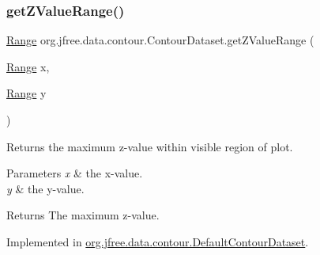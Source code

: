 \mbox{\label{interfaceorg_1_1jfree_1_1data_1_1contour_1_1_contour_dataset_a3a85edeb7c32dc8188b1d4fe945bb542}} 
\subsubsection{\texorpdfstring{get\+Z\+Value\+Range()}{getZValueRange()}}
{\footnotesize\ttfamily \mbox{\hyperlink{classorg_1_1jfree_1_1data_1_1_range}{Range}} org.\+jfree.\+data.\+contour.\+Contour\+Dataset.\+get\+Z\+Value\+Range (\begin{DoxyParamCaption}\item[{\mbox{\hyperlink{classorg_1_1jfree_1_1data_1_1_range}{Range}}}]{x,  }\item[{\mbox{\hyperlink{classorg_1_1jfree_1_1data_1_1_range}{Range}}}]{y }\end{DoxyParamCaption})}

Returns the maximum z-\/value within visible region of plot.


\begin{DoxyParams}{Parameters}
{\em x} & the x-\/value. \\
\hline
{\em y} & the y-\/value.\\
\hline
\end{DoxyParams}
\begin{DoxyReturn}{Returns}
The maximum z-\/value. 
\end{DoxyReturn}


Implemented in \mbox{\hyperlink{classorg_1_1jfree_1_1data_1_1contour_1_1_default_contour_dataset_a516b578d400a06e81eb12e13c2146e59}{org.\+jfree.\+data.\+contour.\+Default\+Contour\+Dataset}}.

\mbox{\label{interfaceorg_1_1jfree_1_1data_1_1contour_1_1_contour_dataset_a57f811c962e8b83f203485a177f4361f}} 
